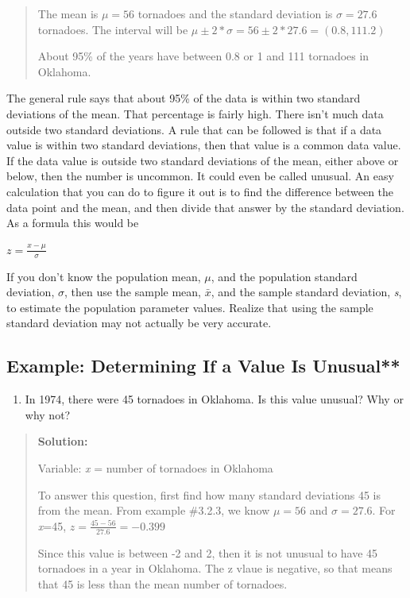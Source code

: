 \documentclass[]{book}
\providecommand{\tightlist}{%
  \setlength{\itemsep}{0pt}\setlength{\parskip}{0pt}}
\begin{document}
\begin{quote}
The mean is \(\mu=56\) tornadoes and the standard deviation is \(\sigma=27.6\) tornadoes. The interval will be \(\mu\pm2*\sigma=56\pm2*27.6=(0.8,111.2)\)

About 95\% of the years have between 0.8 or 1 and 111 tornadoes in Oklahoma.
\end{quote}

The general rule says that about 95\% of the data is within two
standard deviations of the mean. That percentage is fairly high. There
isn't much data outside two standard deviations. A rule that can be
followed is that if a data value is within two standard deviations, then
that value is a common data value. If the data value is outside two
standard deviations of the mean, either above or below, then the number
is uncommon. It could even be called unusual. An easy calculation that
you can do to figure it out is to find the difference between the data
point and the mean, and then divide that answer by the standard
deviation. As a formula this would be

\(z=\frac{x-\mu}{\sigma}\)

If you don't know the population mean, \(\mu\), and the population standard
deviation, \(\sigma\), then use the sample mean, \(\bar{x}\), and the sample standard
deviation, \emph{s}, to estimate the population parameter values. Realize that using the sample standard deviation may not actually be very accurate.

\hypertarget{example-determining-if-a-value-is-unusual}{%
\subsection{Example: Determining If a Value Is Unusual**}\label{example-determining-if-a-value-is-unusual}}

\begin{enumerate}
\def\labelenumi{\alph{enumi}.}
\tightlist
\item
  In 1974, there were 45 tornadoes in Oklahoma. Is this value unusual? Why or why not?
\end{enumerate}

\begin{quote}
\textbf{Solution:}

Variable: \emph{x} = number of tornadoes in Oklahoma

To answer this question, first find how many standard deviations 45 is from the mean. From example \#3.2.3, we know \(\mu=56\) and \(\sigma=27.6\). For \emph{x}=45, \(z=\frac{45-56}{27.6}=-0.399\)

Since this value is between -2 and 2, then it is not unusual to have 45 tornadoes in a year in Oklahoma. The z vlaue is negative, so that means that 45 is less than the mean number of tornadoes.
\end{quote}
\end{document}
